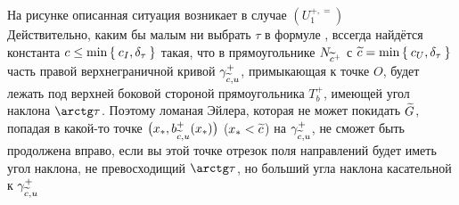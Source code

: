 \begin{note}
    На рисунке описанная ситуация возникает в случае $ (U_1^{+, =}) $ \\
    Действительно, каким бы малым ни выбрать $ \tau $ в формуле , вссегда найдётся константа $ c \le \min\Set{c_I, \delta_\tau} $ такая, что в прямоугольнике $ N_{\widetilde{c}^+} $ с $ \widetilde{c} = \min\Set{c_U, \delta_\tau} $ часть правой верхнеграничной кривой $ \gamma_{\widetilde{c}, u}^+ $, примыкающая к точке $ O $, будет лежать под верхней боковой стороной прямоугольника $ T_b^+ $, имеющей угол наклона $ \arctg \tau $. Поэтому ломаная Эйлера, которая не может покидать $ \widetilde{G} $, попадая в какой-то точке $ \big( x_*, b_{\widetilde{c}, u}^+(x_*) \big) $ ($ x_* < \widetilde{c} $) на $ \gamma_{\widetilde{c}, u}^+ $, не сможет быть продолжена вправо, если вы этой точке отрезок поля направлений будет иметь угол наклона, не превосходищий $ \arctg \tau $, но больший угла наклона касательной к $ \gamma_{\widetilde{c}, u}^+ $
\end{note}

